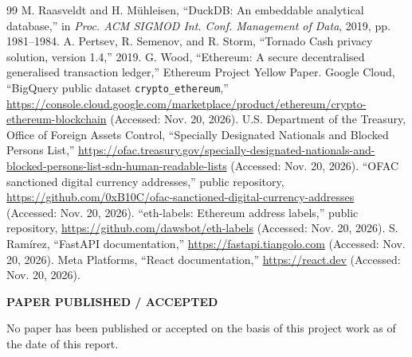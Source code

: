 {\begin{thebibliography}{99}
 M. Raasveldt and H. M\"uhleisen, ``DuckDB: An embeddable analytical database,'' in \emph{Proc. ACM SIGMOD Int. Conf. Management of Data}, 2019, pp. 1981--1984.
 A. Pertsev, R. Semenov, and R. Storm, ``Tornado Cash privacy solution, version 1.4,'' 2019.
 G. Wood, ``Ethereum: A secure decentralised generalised transaction ledger,'' Ethereum Project Yellow Paper.
 Google Cloud, ``BigQuery public dataset \texttt{crypto\_ethereum},'' \url{https://console.cloud.google.com/marketplace/product/ethereum/crypto-ethereum-blockchain} (Accessed: Nov. 20, 2026).
 U.S. Department of the Treasury, Office of Foreign Assets Control, ``Specially Designated Nationals and Blocked Persons List,'' \url{https://ofac.treasury.gov/specially-designated-nationals-and-blocked-persons-list-sdn-human-readable-lists} (Accessed: Nov. 20, 2026).
 ``OFAC sanctioned digital currency addresses,'' public repository, \url{https://github.com/0xB10C/ofac-sanctioned-digital-currency-addresses} (Accessed: Nov. 20, 2026).
 ``eth-labels: Ethereum address labels,'' public repository, \url{https://github.com/dawsbot/eth-labels} (Accessed: Nov. 20, 2026).
 S. Ram\'irez, ``FastAPI documentation,'' \url{https://fastapi.tiangolo.com} (Accessed: Nov. 20, 2026).
 Meta Platforms, ``React documentation,'' \url{https://react.dev} (Accessed: Nov. 20, 2026).
\end{thebibliography}}

\bigskip\bigskip
\begin{center}{\bfseries\fontsize{14}{18}\selectfont PAPER PUBLISHED / ACCEPTED}\end{center}
\vspace{6pt}
\noindent No paper has been published or accepted on the basis of this project work as of the date of this report.
